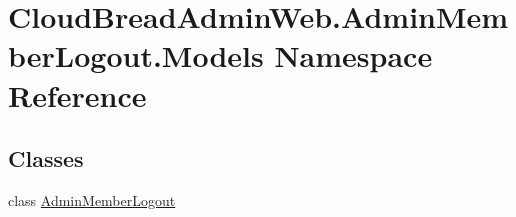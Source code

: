 \hypertarget{namespace_cloud_bread_admin_web_1_1_admin_member_logout_1_1_models}{}\section{Cloud\+Bread\+Admin\+Web.\+Admin\+Member\+Logout.\+Models Namespace Reference}
\label{namespace_cloud_bread_admin_web_1_1_admin_member_logout_1_1_models}
\subsection*{Classes}
\begin{DoxyCompactItemize}
\item 
class \hyperlink{class_cloud_bread_admin_web_1_1_admin_member_logout_1_1_models_1_1_admin_member_logout}{Admin\+Member\+Logout}
\end{DoxyCompactItemize}
